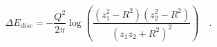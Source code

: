 \begin{equation}
\Delta E_{disc} = -\frac{Q^2}{2\pi} \log\left(\frac{(z_1^2-R^2)(z_2^2-R^2)}{(z_1z_2+R^2)^2}\right)\quad.
\end{equation}

